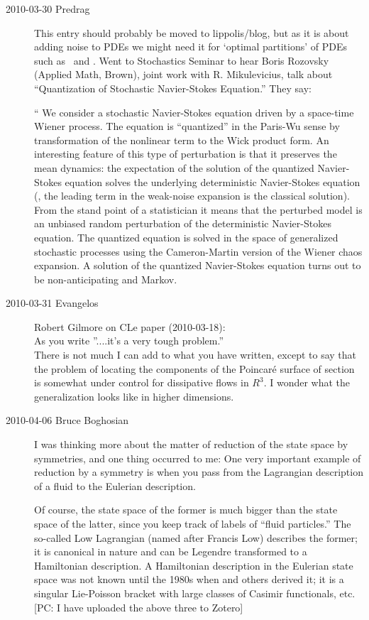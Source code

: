 \begin{description}
\item[2010-03-30 Predrag] This entry should probably be moved
to lippolis/blog, but as it is about adding noise to PDEs we might need it for
`optimal partitions' of PDEs such as \KSe\ and \NSe.
Went to
Stochastics Seminar to hear
Boris Rozovsky (Applied Math, Brown), joint work with
R. Mikulevicius, talk about
``Quantization of Stochastic Navier-Stokes Equation.''
They say:

`` We consider a stochastic Navier-Stokes equation driven by a space-time
Wiener process. The equation is ``quantized'' in the Paris-Wu
sense by transformation of the
nonlinear term to the Wick product form. An interesting feature of
this type of perturbation is that it preserves the mean dynamics: the
expectation of the solution of the quantized Navier-Stokes equation
solves the underlying deterministic Navier-Stokes equation (\ie,
the leading term in the weak-noise expansion is the classical solution).
From the
stand point of a statistician it means that the perturbed model is
an unbiased random perturbation of the deterministic Navier-Stokes
equation. The quantized equation is solved in the space of generalized
stochastic processes using the Cameron-Martin version of the Wiener
chaos expansion. A solution of the quantized Navier-Stokes equation turns out
to be non-anticipating and Markov.

\item[2010-03-31 Evangelos] Robert Gilmore on CLe paper (2010-03-18):\\

As you write ''....it's a very tough problem.''\\

There is not much I can add to what you have written,
except to say that the problem of locating the components
of the Poincar\'e surface of section is somewhat
under control for dissipative flows in $R^3$.
I wonder what the generalization looks like in
higher dimensions.

\item[2010-04-06 Bruce Boghosian] %

I was thinking more about the matter of reduction of the
state space by symmetries, and one thing occurred to me:  One
very important example of reduction by a symmetry is when you
pass from the Lagrangian description of a fluid to the
Eulerian description.

Of course, the state space of the former is much bigger than
the state space of the latter, since you keep track of labels
of ``fluid particles.''
													\toCB
The so-called Low Lagrangian (named
after Francis Low) describes the former; it is canonical in
nature and can be Legendre transformed to a Hamiltonian
description.  A Hamiltonian description in the Eulerian state
space was not known until the 1980s when
 and
others derived it; it is a singular Lie-Poisson bracket with
large classes of Casimir functionals, etc.
[PC: I have uploaded the above three 
to Zotero]


\end{description}
